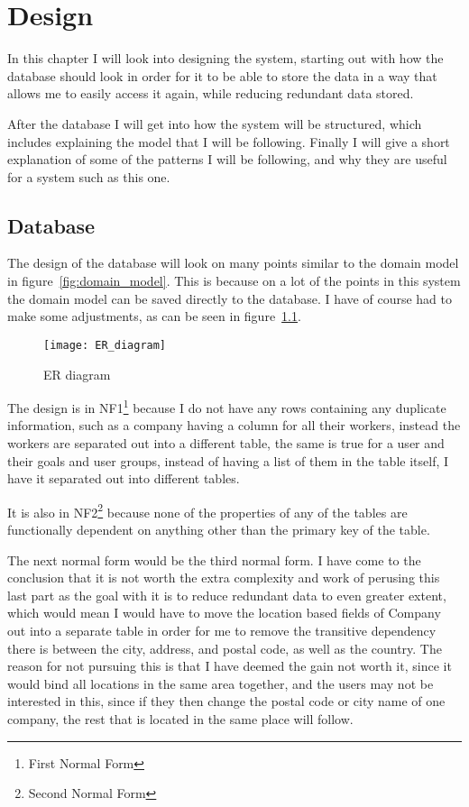 \chapter{Design}
\label{chap:Design}
In this chapter I will look into designing the system, starting out with how the
database should look in order for it to be able to store the data in a way that
allows me to easily access it again, while reducing redundant data stored. 

After the database I will get into how the system will be structured, which
includes explaining the model that I will be following. Finally I will give a
short explanation of some of the patterns I will be following, and why they are
useful for a system such as this one. 

\section{Database}
\label{sec:Database}
The design of the database will look on many points similar to the domain model
in figure~\ref{fig:domain_model}. This is because on a lot of the points in this
system the domain model can be saved directly to the database. I have of course
had to make some adjustments, as can be seen in figure~\ref{fig:er_diagram}. 

\begin{figure}
  \texttt{[image: ER\_diagram]}
  \caption{ER diagram}
  \label{fig:er_diagram}
\end{figure}

The design is in NF1\footnote{First Normal Form} because I do not have any rows
containing any duplicate information, such as a company having a column for all
their workers, instead the workers are separated out into a different
table\cite[p.~430]{DB_systems}, the same is true for a user and their goals and
user groups, instead of having a list of them in the table itself, I have it
separated out into different tables. 

It is also in NF2\footnote{Second Normal Form} because none of the properties of
any of the tables are functionally dependent on anything other than the primary
key of the table\cite[p.~434]{DB_systems}. 

The next normal form would be the third normal form. I have come to the
conclusion that it is not worth the extra complexity and work of perusing this
last part as the goal with it is to reduce redundant data to even greater
extent, which would mean I would have to move the location based fields of
Company out into a separate table in order for me to remove the transitive
dependency\cite[p.~436]{DB_systems} there is between the city, address, and
postal code, as well as the country. The reason for not pursuing this is that I
have deemed the gain not worth it, since it would bind all locations in the same
area together, and the users may not be interested in this, since if they then
change the postal code or city name of one company, the rest that is located in
the same place will follow. 

